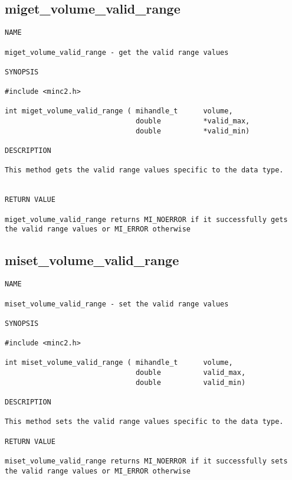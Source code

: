 \documentclass{article}
\begin{document}
\subsection{miget\_volume\_valid\_range}
\begin{verbatim}
NAME 

miget_volume_valid_range - get the valid range values

SYNOPSIS

#include <minc2.h>

int miget_volume_valid_range ( mihandle_t      volume,
                               double          *valid_max,
                               double          *valid_min)
                                
DESCRIPTION

This method gets the valid range values specific to the data type.


RETURN VALUE

miget_volume_valid_range returns MI_NOERROR if it successfully gets 
the valid range values or MI_ERROR otherwise
\end{verbatim}

\subsection{miset\_volume\_valid\_range}
\begin{verbatim}
NAME 

miset_volume_valid_range - set the valid range values

SYNOPSIS

#include <minc2.h>

int miset_volume_valid_range ( mihandle_t      volume,
                               double          valid_max,
                               double          valid_min)
                                
DESCRIPTION

This method sets the valid range values specific to the data type.

RETURN VALUE

miset_volume_valid_range returns MI_NOERROR if it successfully sets 
the valid range values or MI_ERROR otherwise
\end{verbatim}

\end{document}

